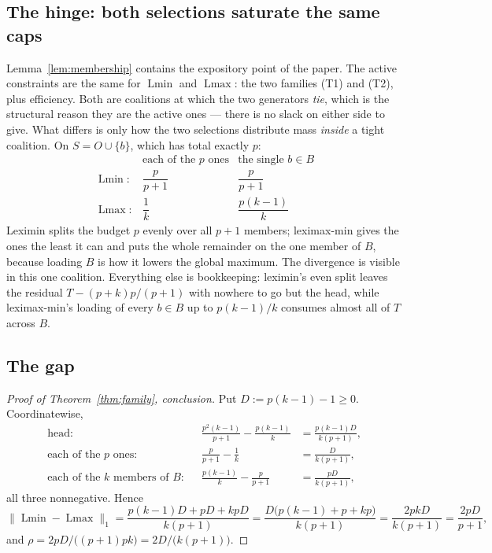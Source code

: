 \documentclass[11pt]{article}
\newcommand{\Lmin}{\operatorname{Lmin}}
\newcommand{\Lmax}{\operatorname{Lmax}}
\begin{document}
\subsection{The hinge: both selections saturate the same caps}

Lemma~\ref{lem:membership} contains the expository point of the paper.  The
active constraints are the same for $\Lmin$ and $\Lmax$: the two families
(T1) and (T2), plus efficiency.  Both are coalitions at which the two
generators \emph{tie}, which is the structural reason they are the active
ones --- there is no slack on either side to give.  What differs is only how
the two selections distribute mass \emph{inside} a tight coalition.  On
$S=O\cup\{b\}$, which has total exactly $p$:
\[
\begin{array}{lcc}
 & \text{each of the }p\text{ ones} & \text{the single }b\in B\\[2pt]
 \Lmin: & \dfrac{p}{p+1} & \dfrac{p}{p+1}\\[10pt]
 \Lmax: & \dfrac1k & \dfrac{p(k-1)}{k}
\end{array}
\]
Leximin splits the budget $p$ evenly over all $p+1$ members; leximax-min
gives the ones the least it can and puts the whole remainder on the one
member of $B$, because loading $B$ is how it lowers the global maximum.  The
divergence is visible in this one coalition.  Everything else is bookkeeping:
leximin's even split leaves the residual $T-(p+k)p/(p+1)$ with nowhere to go
but the head, while leximax-min's loading of every $b\in B$ up to
$p(k-1)/k$ consumes almost all of $T$ across $B$.

\subsection{The gap}\label{sec:gap}

\begin{proof}[Proof of Theorem~\ref{thm:family}, conclusion]
Put $D:=p(k-1)-1\ge0$.  Coordinatewise,
\begin{align*}
 \text{head:}&& \frac{p^2(k-1)}{p+1}-\frac{p(k-1)}{k}&=\frac{p(k-1)D}{k(p+1)},\\
 \text{each of the $p$ ones:}&& \frac{p}{p+1}-\frac1k&=\frac{D}{k(p+1)},\\
 \text{each of the $k$ members of $B$:}&& \frac{p(k-1)}{k}-\frac{p}{p+1}&=\frac{pD}{k(p+1)},
\end{align*}
all three nonnegative.  Hence
\[
 \|\Lmin-\Lmax\|_1=\frac{p(k-1)D+pD+kpD}{k(p+1)}
 =\frac{D\bigl(p(k-1)+p+kp\bigr)}{k(p+1)}
 =\frac{2pkD}{k(p+1)}=\frac{2pD}{p+1},
\]
and $\rho=2pD/\bigl((p+1)pk\bigr)=2D/\bigl(k(p+1)\bigr)$.
\end{proof}
\end{document}
